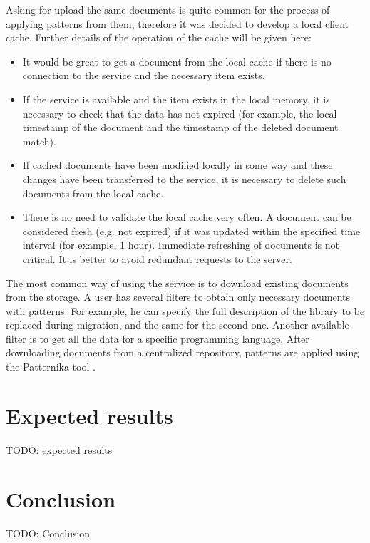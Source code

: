 \documentclass[letterpaper, 10 pt, conference]{ieeeconf}  %
\begin{document}
Asking for upload the same documents is quite common for the process
of applying patterns from them, therefore it was decided to develop a
local client cache. Further details of the operation of the cache will
be given here:
\begin{itemize}
    \item It would be great to get a document from the
local cache if there is no connection to the service and the necessary
item exists.
    \item If the service is available and the item exists in the
local memory, it is necessary to check that the data has not expired
(for example, the local timestamp of the document and the timestamp of
the deleted document match).
    \item If cached documents have been modified locally in some way
and these changes have been transferred to the service, it is
necessary to delete such documents from the local cache.
    \item There is no need to validate the local cache very often. A
document can be considered fresh (e.g. not expired) if it was
updated within the specified time interval (for example, 1 hour).
Immediate refreshing of documents is not critical. It is better to
avoid redundant requests to the server.
\end{itemize}

The most common way of using the service is to download existing
documents from the storage. A user has several filters to obtain only
necessary documents with patterns. For example, he can specify the
full description of the library to be replaced during migration, and
the same for the second one. Another available filter is to get all
the data for a specific programming language. After downloading
documents from a centralized repository, patterns are applied using
the Patternika tool \cite{c1}. 

\section{Expected results}

TODO: expected results

\section{Conclusion}

TODO: Conclusion

\addtolength{\textheight}{-12cm}   %
\end{document}
